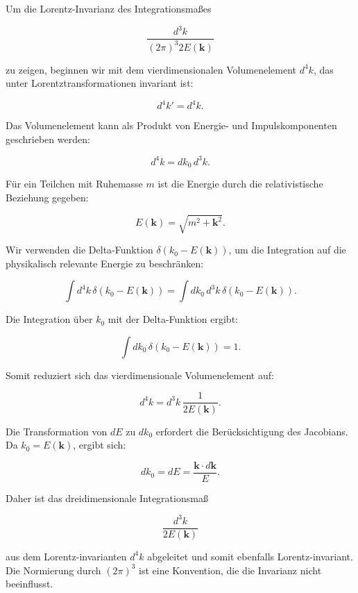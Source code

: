 Um die Lorentz-Invarianz des Integrationsmaßes 

\[
\frac{d^3 k}{(2 \pi)^3 2 E(\mathbf{k})}
\]

zu zeigen, beginnen wir mit dem vierdimensionalen Volumenelement \(d^4 k\), das unter Lorentztransformationen invariant ist:

\[
d^4 k' = d^4 k.
\]

Das Volumenelement kann als Produkt von Energie- und Impulskomponenten geschrieben werden:

\[
d^4 k = dk_0 \, d^3 k.
\]

Für ein Teilchen mit Ruhemasse \(m\) ist die Energie durch die relativistische Beziehung gegeben:

\[
E(\mathbf{k}) = \sqrt{m^2 + \mathbf{k}^2}.
\]

Wir verwenden die Delta-Funktion \(\delta(k_0 - E(\mathbf{k}))\), um die Integration auf die physikalisch relevante Energie zu beschränken:

\[
\int d^4 k \, \delta(k_0 - E(\mathbf{k})) = \int dk_0 \, d^3 k \, \delta(k_0 - E(\mathbf{k})).
\]

Die Integration über \(k_0\) mit der Delta-Funktion ergibt:

\[
\int dk_0 \, \delta(k_0 - E(\mathbf{k})) = 1.
\]

Somit reduziert sich das vierdimensionale Volumenelement auf:

\[
d^4 k = d^3 k \, \frac{1}{2 E(\mathbf{k})}.
\]

Die Transformation von \(dE\) zu \(dk_0\) erfordert die Berücksichtigung des Jacobians. Da \(k_0 = E(\mathbf{k})\), ergibt sich:

\[
dk_0 = dE = \frac{\mathbf{k} \cdot d\mathbf{k}}{E}.
\]

Daher ist das dreidimensionale Integrationsmaß

\[
\frac{d^3 k}{2 E(\mathbf{k})}
\]

aus dem Lorentz-invarianten \(d^4 k\) abgeleitet und somit ebenfalls Lorentz-invariant. Die Normierung durch \((2 \pi)^3\) ist eine Konvention, die die Invarianz nicht beeinflusst.

